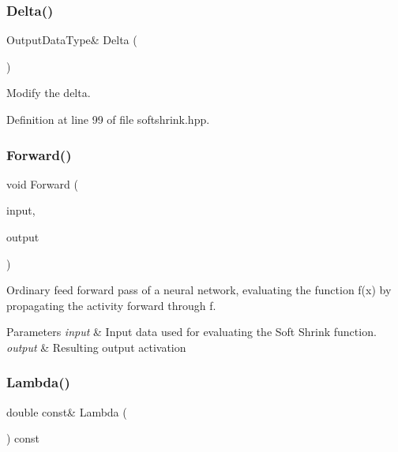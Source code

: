 \subsubsection{Delta()\hspace{0.1cm}{\footnotesize\ttfamily [2/2]}}
{\footnotesize\ttfamily Output\+Data\+Type\& Delta (\begin{DoxyParamCaption}{ }\end{DoxyParamCaption})\hspace{0.3cm}{\ttfamily [inline]}}



Modify the delta. 



Definition at line 99 of file softshrink.\+hpp.

\mbox{\label{classmlpack_1_1ann_1_1SoftShrink_a09440df0a90bdcc766e56e097d91205b}} 
\subsubsection{Forward()}
{\footnotesize\ttfamily void Forward (\begin{DoxyParamCaption}\item[{const Input\+Type \&}]{input,  }\item[{Output\+Type \&}]{output }\end{DoxyParamCaption})}



Ordinary feed forward pass of a neural network, evaluating the function f(x) by propagating the activity forward through f. 


\begin{DoxyParams}{Parameters}
{\em input} & Input data used for evaluating the Soft Shrink function. \\
\hline
{\em output} & Resulting output activation \\
\hline
\end{DoxyParams}
\mbox{\label{classmlpack_1_1ann_1_1SoftShrink_acb669457ad59e62d0fccc5bae3a6c35e}} 
\subsubsection{Lambda()\hspace{0.1cm}{\footnotesize\ttfamily [1/2]}}
{\footnotesize\ttfamily double const\& Lambda (\begin{DoxyParamCaption}{ }\end{DoxyParamCaption}) const\hspace{0.3cm}{\ttfamily [inline]}}



